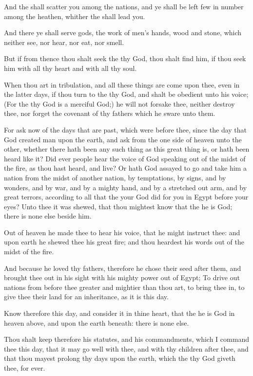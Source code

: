 \Verse And the \LORD shall scatter you among the nations, and ye shall be left few in number among the heathen, whither the \LORD shall lead you.

\Verse And there ye shall serve gods, the work of men's hands, wood and stone, which neither see, nor hear, nor eat, nor smell.

\Verse But if from thence thou shalt seek the \LORD thy God, thou shalt find him, if thou seek him with all thy heart and with all thy soul.

\Verse When thou art in tribulation, and all these things are come upon thee, even in the latter days, if thou turn to the \LORD thy God, and shalt be obedient unto his voice; \Verse (For the \LORD thy God is a merciful God;) he will not forsake thee, neither destroy thee, nor forget the covenant of thy fathers which he sware unto them.

\Verse For ask now of the days that are past, which were before thee, since the day that God created man upon the earth, and ask from the one side of heaven unto the other, whether there hath been any such thing as this great thing is, or hath been heard like it?  \Verse Did ever people hear the voice of God speaking out of the midst of the fire, as thou hast heard, and live?  \Verse Or hath God assayed to go and take him a nation from the midst of another nation, by temptations, by signs, and by wonders, and by war, and by a mighty hand, and by a stretched out arm, and by great terrors, according to all that the \LORD your God did for you in Egypt before your eyes?  \Verse Unto thee it was shewed, that thou mightest know that the \LORD he is God; there is none else beside him.

\Verse Out of heaven he made thee to hear his voice, that he might instruct thee: and upon earth he shewed thee his great fire; and thou heardest his words out of the midst of the fire.

\Verse And because he loved thy fathers, therefore he chose their seed after them, and brought thee out in his sight with his mighty power out of Egypt; \Verse To drive out nations from before thee greater and mightier than thou art, to bring thee in, to give thee their land for an inheritance, as it is this day.

\Verse Know therefore this day, and consider it in thine heart, that the \LORD he is God in heaven above, and upon the earth beneath: there is none else.

\Verse Thou shalt keep therefore his statutes, and his commandments, which I command thee this day, that it may go well with thee, and with thy children after thee, and that thou mayest prolong thy days upon the earth, which the \LORD thy God giveth thee, for ever.

